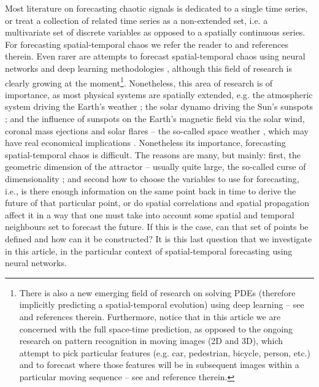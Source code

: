 \documentclass[journal]{IEEEtran}
\begin{document}
Most literature on forecasting chaotic signals is dedicated to a single time series, or treat a collection of related time series as a 
non-extended set, i.e. a multivariate set of discrete variables as opposed to a spatially continuous series. 
For forecasting spatial-temporal chaos we 
refer the reader to 
\cite{doi:10.1063/1.165894,PhysRevE.51.R2709,PhysRevLett.85.2300,ORSTAVIK1998145,
Parlitz2000NonlinearPO,2000PhRvL..84.1890P,Covas,Xia2006APF,ENV:ENV2266,covas2016,ENV:ENV2456} and 
references therein. Even rarer are attempts to forecast spatial-temporal chaos using neural networks and deep learning methodologies 
\cite{covaspeixinhojoao,2017arXiv170805094M,2017arXiv171100636M,2017arXiv171110566R,2017arXiv171110561R,2017arXiv171009668L, 
2017arXiv171205293C, ghaderi2017deepforecast,2017Chaos..27d1102L,
2018JCoPh.357..125R,2018arXiv180106637R}, although this field of research is clearly growing at the moment\footnote{
There is also a new emerging field of research on solving PDEs (therefore implicitly predicting a spatial-temporal
evolution) using deep learning -- see \cite{2017arXiv170905963B,2017arXiv170807469S,2017arXiv170604702E} and references therein.
Furthermore, notice that in this article we are concerned with the full space-time prediction, 
as opposed to the ongoing research on pattern recognition in moving 
images (2D and 3D), which attempt to pick particular features (e.g. car, pedestrian, bicycle, person, etc.) and to forecast where 
those features will be in subsequent images within a particular moving sequence -- see \cite{article_motion} and reference therein.
}.
 Nonetheless, this area of 
research is of importance, as most physical systems are spatially extended, e.g. the atmospheric system driving the Earth's weather
\cite{9780521857291}; the solar dynamo driving the Sun's sunspots \cite{9780198512905}; and the influence of sunspots on the Earth's 
magnetic field via the solar wind, coronal mass ejections and solar flares -- the so-called space weather 
\cite{1851RSPT..141..123S, 1852RSPT..142..103S, 1979P&SS...27.1001S,
1983SoPh...89..195E,1965P&SS...13....9P,2000AdSpR..26...27W,2003A&AT...22..861B,2005GeoRL..3221106S,
2005SpWea...3.8C01K,2006GMS...165..367T,2006GeoRL..3318101H, 2009SunGe...4...55C,2011SpWea...9.6001C,
2013EGUGA..1510865W}, which may have real economical implications \cite{2015SpWea..13..524S}.
Nonetheless its importance, forecasting spatial-temporal chaos is difficult.
The reasons are many, but mainly: first, the geometric dimension of the 
attractor \cite{1985PhLA..107..101G} -- usually quite large, the so-called curse of dimensionality \cite{9780486428093}; 
and second how to choose the variables to use for forecasting, i.e., is there 
enough information on the same point back in time to derive the future of that particular point, or do spatial correlations and spatial 
propagation affect it in a way that one must take into account some spatial and temporal neighbours set to forecast the future.
If this is the case, can that set of points be defined and how can it be constructed? 
It is this last question that we investigate in this article, in the 
particular context of spatial-temporal forecasting using neural networks. 
\end{document}
